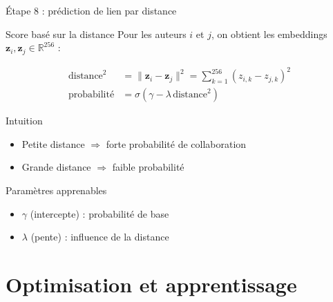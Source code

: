 \documentclass[9pt,aspectratio=169,professionalfonts]{beamer}
\begin{document}
\begin{frame}{Étape 8 : prédiction de lien par distance}
\begin{block}{Score basé sur la distance}
Pour les auteurs $i$ et $j$, on obtient les embeddings $\mathbf z_i, \mathbf z_j \in \mathbb R^{256}$ :

\begin{align}
\text{distance}^2 &= \lVert\mathbf z_i - \mathbf z_j\rVert^2 = \sum_{k=1}^{256} (z_{i,k} - z_{j,k})^2\\[4pt]
\text{probabilité} &= \sigma(\gamma - \lambda\,\text{distance}^2)
\end{align}
\end{block}

\begin{block}{Intuition}
\begin{itemize}
    \item Petite distance \(\Rightarrow\) forte probabilité de collaboration
    \item Grande distance \(\Rightarrow\) faible probabilité
\end{itemize}
\end{block}

\begin{block}{Paramètres apprenables}
\begin{itemize}
    \item $\gamma$ (intercepte) : probabilité de base
    \item $\lambda$ (pente) : influence de la distance
\end{itemize}
\end{block}
\end{frame}

\section{Optimisation et apprentissage}
\end{document}
